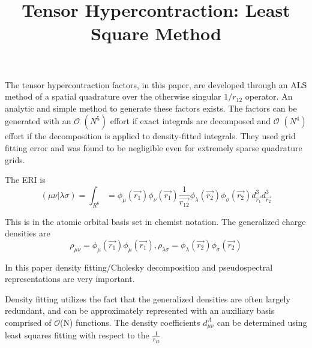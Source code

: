 \documentclass[10pt, draft]{article}
\begin{document}
\title{Tensor Hypercontraction: Least Square Method}
\maketitle
\raggedright
The tensor hypercontraction factors, in this paper, are developed through an ALS method of a spatial quadrature over the otherwise singular
$1/r_{12}$  
operator.  An analytic and simple method to generate these factors exists.  The factors can be generated with an 
$\mathcal{O}$
$(N^5)$ effort if exact integrals are decomposed and 
$\mathcal{O}$
$(N^4)$ effort if the decomposition is applied to density-fitted integrals. They used grid fitting error and was found to be negligible even for extremely sparse quadrature grids.\par

The ERI is $$(\mu \nu | \lambda \sigma) = \int_{R^6} = \phi_\mu(\vec{r_1})\phi_\nu(\vec{r_1}) \frac{1}{\vec{r_{12}}} \phi_\lambda(\vec{r_2})\phi_\sigma(\vec{r_2}) d^3_{\vec{r_1}} d^3_{\vec{r_2}} $$

This is in the atomic orbital basis set in chemist notation. The generalized charge densities are $$\rho_{\mu\nu} = \phi_\mu(\vec{r_1}) \phi_\mu(\vec{r_1}) , \rho_{\lambda\sigma} = \phi_\lambda(\vec{r_2}) \phi_\sigma(\vec{r_2})$$

In this paper density fitting/Cholesky decomposition and pseudospectral representations are very important. $$$$


Density fitting utilizes the fact that the generalized densities are often largely redundant, and can be approximately represented with an auxiliary basis comprised of $\mathcal{O}$(N) functions.  The density coefficients $d^A_{\mu\nu}$ can be determined using least squares fitting with respect to the $\frac{1}{r_{12}}$  $$$$
\end{document}
